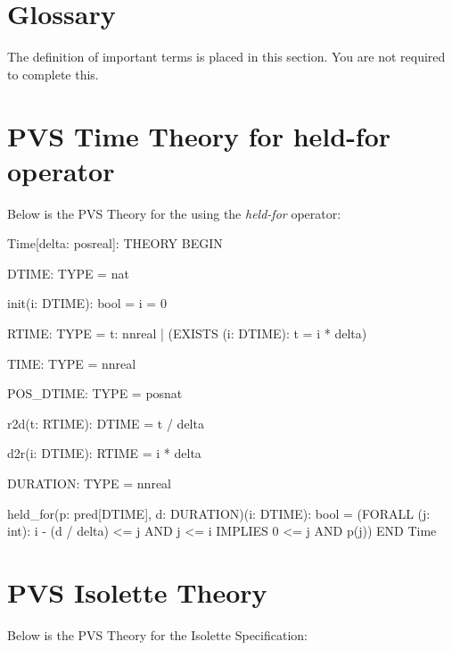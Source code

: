 \documentclass[fontsize=12pt,paper=letter,twoside]{scrartcl}
\begin{document}
\section{Glossary}

The definition of important terms is placed in this section. You are not required to complete this.



\newpage
\appendix

\section{PVS Time Theory for held-for operator}

Below is the PVS Theory for the using the \emph{held-for} operator:\\

\begin{pvs}
Time[delta: posreal]: THEORY
 BEGIN

  DTIME: TYPE = nat

  init(i: DTIME): bool = i = 0

  RTIME: TYPE = {t: nnreal | (EXISTS (i: DTIME): t = i * delta)}

  TIME: TYPE = nnreal

  POS_DTIME: TYPE = posnat

  r2d(t: RTIME): DTIME = t / delta

  d2r(i: DTIME): RTIME = i * delta

  DURATION: TYPE = nnreal

  held_for(p: pred[DTIME], d: DURATION)(i: DTIME): bool =
      (FORALL (j: int):
         i - (d / delta) <= j AND j <= i IMPLIES 0 <= j AND p(j))
 END Time	
\end{pvs}

\newpage
\section{PVS Isolette Theory}

Below is the PVS Theory for the Isolette Specification:\\
\end{document}
